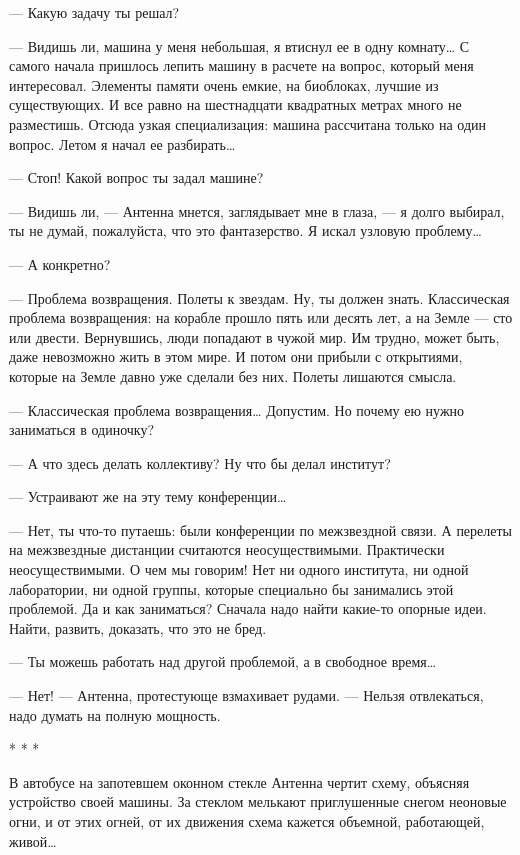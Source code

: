 — Какую задачу ты решал?

— Видишь ли,  машина у  меня небольшая,  я втиснул  ее в  одну комнату…  С
самого начала пришлось  лепить машину  в расчете на  вопрос, который  меня
интересовал.  Элементы  памяти  очень  емкие,  на  биоблоках,  лучшие   из
существующих. И  все  равно  на шестнадцати  квадратных  метрах  много  не
разместишь. Отсюда узкая специализация:  машина рассчитана только на  один
вопрос. Летом я начал ее разбирать…

— Стоп! Какой вопрос ты задал машине?

— Видишь ли, — Антенна мнется, заглядывает мне в глаза, — я долго выбирал,
ты не думай, пожалуйста, что это фантазерство. Я искал узловую проблему…

— А конкретно?

—  Проблема  возвращения.   Полеты  к  звездам.   Ну,  ты  должен   знать.
Классическая проблема возвращения: на корабле прошло пять или десять  лет,
а на Земле —  сто или двести.  Вернувшись, люди попадают  в чужой мир.  Им
трудно, может быть, даже невозможно жить в этом мире. И потом они  прибыли
с открытиями, которые на Земле давно уже сделали без них. Полеты  лишаются
смысла.

—  Классическая  проблема  возвращения…  Допустим.  Но  почему  ею   нужно
заниматься в одиночку?

— А что здесь делать коллективу? Ну что бы делал институт?

— Устраивают же на эту тему конференции…

— Нет,  ты  что-то  путаешь:  были конференции  по  межзвездной  связи.  А
перелеты на межзвездные  дистанции считаются неосуществимыми.  Практически
неосуществимыми. О  чем мы  говорим!  Нет ни  одного института,  ни  одной
лаборатории, ни  одной  группы,  которые  специально  бы  занимались  этой
проблемой. Да и как заниматься? Сначала надо найти какие-то опорные  идеи.
Найти, развить, доказать, что это не бред.

— Ты можешь работать над другой проблемой, а в свободное время…

— Нет! —  Антенна, протестующе  взмахивает рудами.  — Нельзя  отвлекаться,
надо думать на полную мощность.

* * *

В автобусе на  запотевшем оконном  стекле Антенна  чертит схему,  объясняя
устройство своей машины. За стеклом мелькают приглушенные снегом  неоновые
огни, и от этих огней, от их движения схема кажется объемной,  работающей,
живой…

